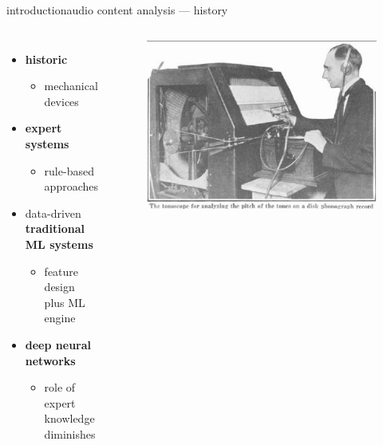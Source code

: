         \begin{frame}{introduction}{audio content analysis --- history}
            \begin{columns}
            \begin{itemize}
                \item<1->   \textbf{historic}
                    \begin{itemize}
                        \item   mechanical devices
                    \end{itemize}
                \smallskip
                \item<2->   \textbf{expert systems}
                            \begin{itemize}
                                \item   rule-based approaches
                            \end{itemize}
                \smallskip
                \item<3->   data-driven \textbf{traditional ML systems }
                    \begin{itemize}
                        \item   feature design plus ML engine
                    \end{itemize}
                \smallskip
                \item<4->   \textbf{deep neural networks}
                    \begin{itemize}
                        \item   role of expert knowledge diminishes
                    \end{itemize}
            \end{itemize}
                \begin{figure}
                    \includegraphics[width=\columnwidth]{graph/tonoscope}
                \end{figure}
            \end{columns}
        \end{frame}
        
